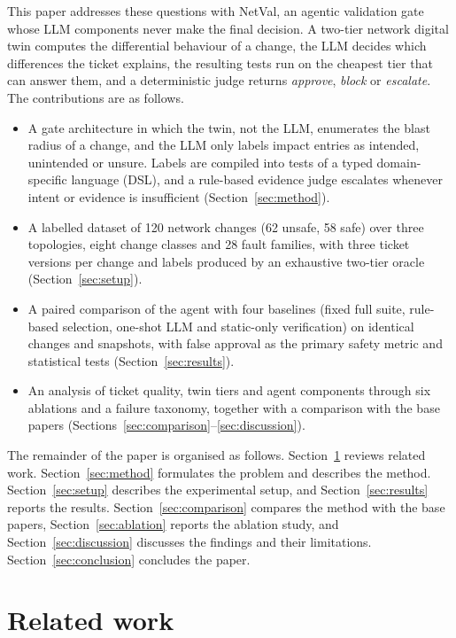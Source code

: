 \documentclass[pdflatex,iicol,sn-mathphys-num]{sn-jnl}%
\theoremstyle{thmstyletwo}%
\begin{document}
This paper addresses these questions with NetVal, an agentic validation gate whose LLM components never make the final decision. A two-tier network digital twin computes the differential behaviour of a change, the LLM decides which differences the ticket explains, the resulting tests run on the cheapest tier that can answer them, and a deterministic judge returns \emph{approve}, \emph{block} or \emph{escalate}. The contributions are as follows.
\begin{itemize}
\item A gate architecture in which the twin, not the LLM, enumerates the blast radius of a change, and the LLM only labels impact entries as intended, unintended or unsure. Labels are compiled into tests of a typed domain-specific language (DSL), and a rule-based evidence judge escalates whenever intent or evidence is insufficient (Section~\ref{sec:method}).
\item A labelled dataset of 120 network changes (62 unsafe, 58 safe) over three topologies, eight change classes and 28 fault families, with three ticket versions per change and labels produced by an exhaustive two-tier oracle (Section~\ref{sec:setup}).
\item A paired comparison of the agent with four baselines (fixed full suite, rule-based selection, one-shot LLM and static-only verification) on identical changes and snapshots, with false approval as the primary safety metric and statistical tests (Section~\ref{sec:results}).
\item An analysis of ticket quality, twin tiers and agent components through six ablations and a failure taxonomy, together with a comparison with the base papers (Sections~\ref{sec:comparison}--\ref{sec:discussion}).
\end{itemize}

The remainder of the paper is organised as follows. Section~\ref{sec:related} reviews related work. Section~\ref{sec:method} formulates the problem and describes the method. Section~\ref{sec:setup} describes the experimental setup, and Section~\ref{sec:results} reports the results. Section~\ref{sec:comparison} compares the method with the base papers, Section~\ref{sec:ablation} reports the ablation study, and Section~\ref{sec:discussion} discusses the findings and their limitations. Section~\ref{sec:conclusion} concludes the paper.

\section{Related work}\label{sec:related}
\end{document}

